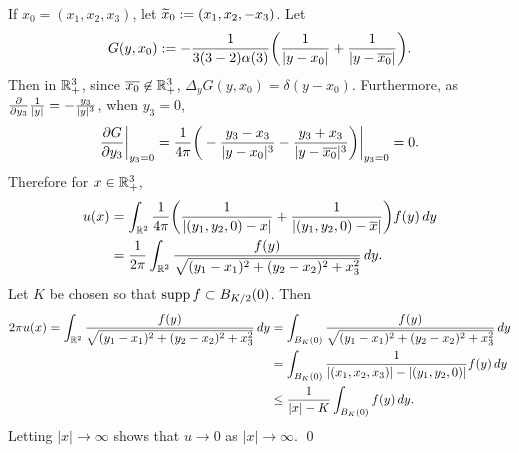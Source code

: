 If $x_{0} = (x_{1}, x_{2}, x_{3})$, let $\widetilde{x}_{0} := (x_{1}, x_{2}, -x_{3})$. Let
$$G(y, x_{0}) := -\frac{1}{3(3 - 2)\alpha(3)}\bigg(\frac{1}{|y - x_{0}|} + \frac{1}{|y - \overline{x_{0}}|}\bigg).$$
Then in $\mathbb{R}^{3}_{+}$, since $\overline{x_{0}} \not\in \mathbb{R}^{3}_{+}$, $\Delta_{y}G(y, x_{0}) = \delta(y - x_{0})$.
Furthermore, as $\frac{\partial}{\partial y_{3}}\frac{1}{|y|} = -\frac{y_{3}}{|y|^{3}}$, when $y_{3} = 0$,
\begin{align*}
\frac{\partial G}{\partial y_{3}}\bigg|_{y_{3} = 0} = \frac{1}{4\pi}\bigg(-\frac{y_{3} - x_{3}}{|y - x_{0}|^{3}} - \frac{y_{3} + x_{3}}{|y - \overline{x_{0}}|^{3}}\bigg)\bigg|_{y_{3} = 0} = 0.
\end{align*}
Therefore for $x \in \mathbb{R}^{3}_{+}$,
\begin{align*}
u(x) &= \int_{\mathbb{R}^{2}}\frac{1}{4\pi}\bigg(\frac{1}{|(y_{1}, y_{2}, 0) - x|} + \frac{1}{|(y_{1}, y_{2}, 0) - \overline{x}|}\bigg)f(y)\, dy\\
&= \frac{1}{2\pi}\int_{\mathbb{R}^{2}}\frac{f(y)}{\sqrt{(y_{1} - x_{1})^{2} + (y_{2} - x_{2})^{2} + x_{3}^{2}}}\, dy.
\end{align*}
Let $K$ be chosen so that $\operatorname{supp} f \subset B_{K/2}(0)$. Then
\begin{align*}
2\pi u(x) = \int_{\mathbb{R}^{2}}\frac{f(y)}{\sqrt{(y_{1} - x_{1})^{2} + (y_{2} - x_{2})^{2} + x_{3}^{2}}}\, dy &= \int_{B_{K}(0)}\frac{f(y)}{\sqrt{(y_{1} - x_{1})^{2} + (y_{2} - x_{2})^{2} + x_{3}^{2}}}\, dy\\
&= \int_{B_{K}(0)}\frac{1}{|(x_{1}, x_{2}, x_{3})| - |(y_{1}, y_{2}, 0)|}f(y)\, dy\\
&\leq \frac{1}{|x| - K}\int_{B_{K}(0)}f(y)\, dy.
\end{align*}
Letting $|x| \rightarrow \infty$ shows that $u \rightarrow 0$ as $|x| \rightarrow \infty$.
\hfill\qed

